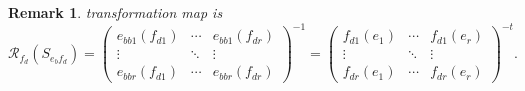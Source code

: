\documentclass[aps,preprint]{revtex4}
\newtheorem{remark}[theorem]{Remark}
\begin{document}
\begin{remark}
transformation map is 
\begin{equation}
\mathcal{R}_{f_{d}}\left( S_{e_{b}f_{d}}\right) =\left( 
\begin{array}{ccc}
e_{bb1}\left( f_{d1}\right) & \cdots & e_{bb1}\left( f_{dr}\right) \\ 
\vdots & \ddots & \vdots \\ 
e_{bbr}\left( f_{d1}\right) & \cdots & e_{bbr}\left( f_{dr}\right)%
\end{array}%
\right) ^{-1}=\left( 
\begin{array}{ccc}
f_{d1}\left( e_{1}\right) & \cdots & f_{d1}\left( e_{r}\right) \\ 
\vdots & \ddots & \vdots \\ 
f_{dr}\left( e_{1}\right) & \cdots & f_{dr}\left( e_{r}\right)%
\end{array}%
\right) ^{-t}.
\end{equation}
\end{remark}
\end{document}
